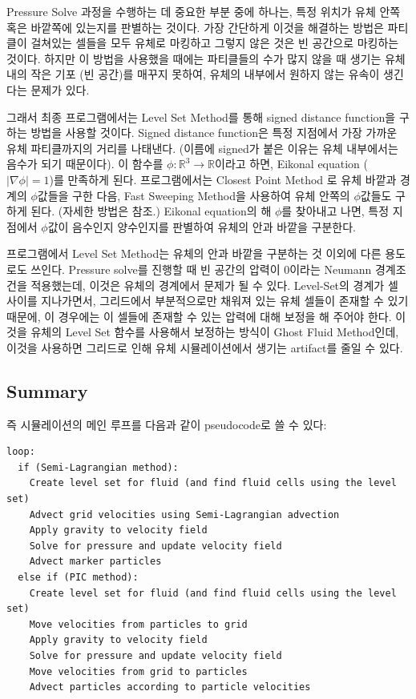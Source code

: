 \documentclass[12pt, A4]{article}
\begin{document}
Pressure Solve 과정을 수행하는 데 중요한 부분 중에 하나는, 특정 위치가 유체 안쪽 혹은 바깥쪽에 있는지를 판별하는 것이다. 가장 간단하게 이것을 해결하는 방법은 파티클이 걸쳐있는 셀들을 모두 유체로 마킹하고 그렇지 않은 것은 빈 공간으로 마킹하는 것이다. 하지만 이 방법을 사용했을 때에는 파티클들의 수가 많지 않을 때 생기는 유체 내의 작은 기포 (빈 공간)를 매꾸지 못하여, 유체의 내부에서 원하지 않는 유속이 생긴다는 문제가 있다.

그래서 최종 프로그램에서는 Level Set Method를 통해 signed distance function을 구하는 방법을 사용할 것이다. Signed distance function은 특정 지점에서 가장 가까운 유체 파티클까지의 거리를 나태낸다. (이름에 signed가 붙은 이유는 유체 내부에서는 음수가 되기 때문이다). 이 함수를 $\phi: \mathbb{R}^3 \rightarrow \mathbb{R}$이라고 하면, Eikonal equation ($|\nabla \phi| = 1$)를 만족하게 된다. 프로그램에서는 Closest Point Method \cite[p. 11]{dist-function}로 유체 바깥과 경계의 $\phi$값들을 구한 다음, Fast Sweeping Method\cite{fast-sweeping}을 사용하여 유체 안쪽의 $\phi$값들도 구하게 된다. (자세한 방법은 \cite[p.49-p.56, p.126]{fluid-sim-cg} 참조.) Eikonal equation의 해 $\phi$를 찾아내고 나면, 특정 지점에서 $\phi$값이 음수인지 양수인지를 판별하여 유체의 안과 바깥을 구분한다.

프로그램에서 Level Set Method는 유체의 안과 바깥을 구분하는 것 이외에 다른 용도로도 쓰인다. Pressure solve를 진행할 때 빈 공간의 압력이 0이라는 Neumann 경계조건을 적용했는데, 이것은 유체의 경계에서 문제가 될 수 있다. Level-Set의 경계가 셀 사이를 지나가면서, 그리드에서 부분적으로만 채워져 있는 유체 셀들이 존재할 수 있기 때문에, 이 경우에는 이 셀들에 존재할 수 있는 압력에 대해 보정을 해 주어야 한다. 이것을 유체의 Level Set 함수를 사용해서 보정하는 방식이 Ghost Fluid Method인데, 이것을 사용하면 그리드로 인해 유체 시뮬레이션에서 생기는 artifact를 줄일 수 있다. \cite[p.127-129]{fluid-sim-cg}

\subsection{Summary}

즉 시뮬레이션의 메인 루프를 다음과 같이 pseudocode로 쓸 수 있다:

\begin{verbatim}
loop:
  if (Semi-Lagrangian method):
    Create level set for fluid (and find fluid cells using the level set)
    Advect grid velocities using Semi-Lagrangian advection 
    Apply gravity to velocity field
    Solve for pressure and update velocity field
    Advect marker particles
  else if (PIC method):
    Create level set for fluid (and find fluid cells using the level set)
    Move velocities from particles to grid
    Apply gravity to velocity field
    Solve for pressure and update velocity field
    Move velocities from grid to particles
    Advect particles according to particle velocities
\end{verbatim}
\end{document}
